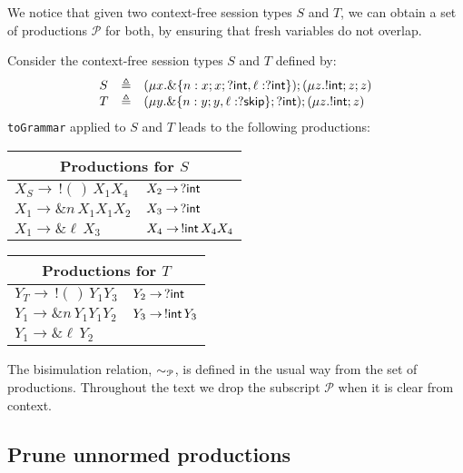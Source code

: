 We notice that given two context-free session types $S$ and $T$, we can obtain
a set of productions $\mathcal{P}$ for both, by ensuring that fresh variables
do not overlap.

\begin{example}
\label{ex:productions}
	Consider the context-free session types $S$ and $T$ defined by:
	\[\begin{array}{lll}
		S & \triangleq & (\mu x . \&\{n: x;x;?\mathsf{int}, \ell: ?\mathsf{int}\});(\mu z . !\mathsf{int} ; z;z)\\
		T & \triangleq & (\mu y . \&\{n: y;y, \ell: ?\mathsf{skip}\};?\mathsf{int});(\mu z . !\mathsf{int} ; z)
	\end{array}\]
	\lstinline{toGrammar} applied to $S$ and $T$ leads to the following productions:\\

	\centering
	\begin{tabular}{l l}
		\multicolumn{2}{c}{Productions for $S$}\\ \hline
		$X_S \rightarrow \,! (\,)\,X_1 X_4$ &$X_2 \rightarrow \,? \mathsf{int}$\\
		$X_1 \rightarrow \& n\, X_1 X_1 X_2$&$X_3 \rightarrow \,? \mathsf{int}$\\
		$X_1 \rightarrow \& \ell\, X_3$ &$X_4 \rightarrow \,!\mathsf{int}\, X_4 X_4$\\
	\end{tabular} \qquad
	\begin{tabular}{l l}
		\multicolumn{2}{c}{Productions for $T$}\\ \hline
		$Y_T \rightarrow \,! (\,)\, Y_1 Y_3 $&$Y_2 \rightarrow \,? \mathsf{int}$\\
		$Y_1 \rightarrow \& n\, Y_1 Y_1 Y_2 $&$Y_3 \rightarrow \,!\mathsf{int}\, Y_3$\\
		$Y_1 \rightarrow \& \ell \,Y_2 $ &\\
	\end{tabular}
\end{example}

The bisimulation relation, $\sim_{\mathcal{P}}$, is defined in the usual way from the
set of productions. Throughout the text we drop the subscript $\mathcal{P}$ when
it is clear from context.

\subsection{Prune unnormed productions}
\label{subsec:prune}

